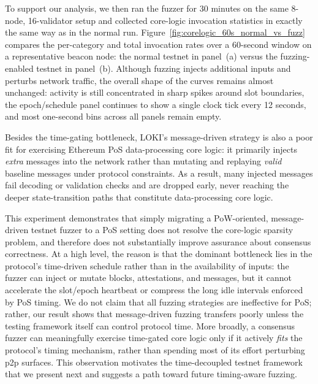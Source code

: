 To support our analysis, we then ran the fuzzer for 30 minutes on the same 8-node, 16-validator setup and collected core-logic invocation statistics in exactly the same way as in the normal run. 
Figure~\ref{fig:corelogic_60s_normal_vs_fuzz} compares the per-category and total invocation rates over a 60-second window on a representative beacon node: the normal testnet in panel~(a) versus the fuzzing-enabled testnet in panel~(b). 
Although fuzzing injects additional inputs and perturbs network traffic, the overall shape of the curves remains almost unchanged: activity is still concentrated in sharp spikes around slot boundaries, the epoch/schedule panel continues to show a single clock tick every 12 seconds, and most one-second bins across all panels remain empty.

Besides the time-gating bottleneck, LOKI's message-driven strategy is also a poor fit for exercising Ethereum PoS data-processing core logic: it primarily injects \emph{extra} messages into the network rather than mutating and replaying \emph{valid} baseline messages under protocol constraints.
As a result, many injected messages fail decoding or validation checks and are dropped early, never reaching the deeper state-transition paths that constitute data-processing core logic.

This experiment demonstrates that simply migrating a PoW-oriented, message-driven testnet fuzzer to a PoS setting does not resolve the core-logic sparsity problem, and therefore does not substantially improve assurance about consensus correctness. At a high level, the reason is that the dominant bottleneck lies in the protocol’s time-driven schedule rather than in the availability of inputs: the fuzzer can inject or mutate blocks, attestations, and messages, but it cannot accelerate the slot/epoch heartbeat or compress the long idle intervals enforced by PoS timing.
We do not claim that all fuzzing strategies are ineffective for PoS; rather, our result shows that message-driven fuzzing transfers poorly unless the testing framework itself can control protocol time. More broadly, a consensus fuzzer can meaningfully exercise time-gated core logic only if it actively \emph{fits} the protocol's timing mechanism, rather than spending most of its effort perturbing p2p surfaces. This observation motivates the time-decoupled testnet framework that we present next and suggests a path toward future timing-aware fuzzing.